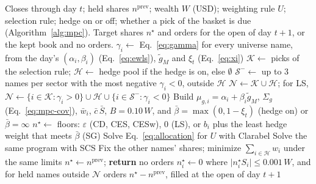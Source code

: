 \begin{algorithm}[t]
\caption{One allocation decision after the close of day $t$.}
\label{alg:allocation}
\begin{algorithmic}[1]
  \REQUIRE Closes through day $t$; held shares $n^{\mathrm{prev}}$; wealth $W$ (USD); weighting rule $U$; selection
    rule; hedge on or off; whether a pick of the basket is due (Algorithm~\ref{alg:mpc}).
  \ENSURE Target shares $n^{\star}$ and orders for the open of day $t+1$, or the kept book and no orders.
  \STATE $\gamma_i \gets$ Eq.~\ref{eq:gamma} for every universe name, from the day's $(\alpha_i, \beta_i)$
    (Eq.~\ref{eq:ewls}), $\tilde g_M$ and $\xi_t$ (Eq.~\ref{eq:xi})
    \STATE $\mathcal{K} \gets$ picks of the selection rule; $\mathcal{H} \gets$ hedge pool if the hedge is on, else
      $\emptyset$
    \STATE $\mathcal{S}^{-} \gets$ up to $3$ names per sector with the most negative $\gamma_i < 0$, outside
      $\mathcal{H}$ \hfill {}
  \ENDIF
  \STATE $\mathcal{N} \gets \mathcal{K} \cup \mathcal{H}$; for LS,
    $\mathcal{N} \gets \{ i \in \mathcal{K} : \gamma_i > 0 \} \cup \mathcal{H} \cup
    \{ i \in \mathcal{S}^{-} : \gamma_i < 0 \}$
  \STATE Build $\mu_{g,i} = \alpha_i + \beta_i \tilde g_M$, $\Sigma_g$ (Eq.~\ref{eq:mpc-cov}), $\bar w_i$,
    $\bar c\,\bar S$, $B = 0.10\,W$, and $\bar\beta = \max(0, 1 - \xi_t)$ (hedge on) or $\bar\beta = \infty$
    \STATE $n^{\star} \gets$ floors: $\varepsilon$ (CD, CES, CESw), $0$ (LS), or $b_i$ plus the least hedge weight
      that meets $\bar\beta$ (SG) \hfill {}
  \ELSE
    \STATE Solve Eq.~\ref{eq:allocation} for $U$ with Clarabel \hfill {}
      \STATE Solve the same program with SCS
    \ENDIF
      \STATE Fix the other names' shares; minimize $\sum_{i \in \mathcal{H}} w_i$ under the same limits
    \ENDIF
  \ENDIF
    \STATE $n^{\star} \gets n^{\mathrm{prev}}$; \textbf{return} no orders \hfill {}
  \ENDIF
  \STATE $n^{\star}_i \gets 0$ where $\lvert n^{\star}_i S_i \rvert \le 0.001\,W$, and for held names outside
    $\mathcal{N}$
  \RETURN orders $n^{\star} - n^{\mathrm{prev}}$, filled at the open of day $t+1$
\end{algorithmic}
\end{algorithm}
